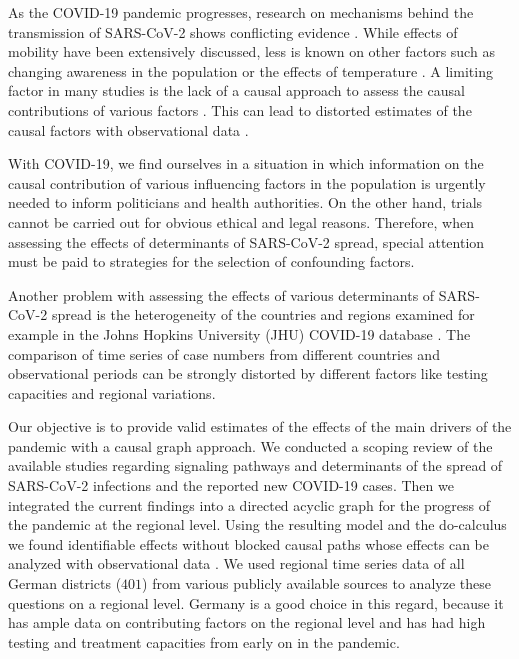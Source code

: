 \documentclass[]{elsarticle} %
\begin{document}
As the COVID-19 pandemic progresses, research on mechanisms behind the transmission of SARS-CoV-2 shows conflicting evidence \citep{who2020report, Chinazzi395, guan2020clinical}. While effects of mobility have been extensively discussed, less is known on other factors such as changing awareness in the population \citep{higgins_correlations_2020, li_retrospective_2020, yuan_trends_2020} or the effects of temperature \citep{bannister-tyrrell_preliminary_2020, demongeot_temperature_2020, liu_impact_2020}. A limiting factor in many studies is the lack of a causal approach to assess the causal contributions of various factors \citep{Greenland1999}. This can lead to distorted estimates of the causal factors with observational data \citep{Greenland1999, schipf_directed_2011, textor_robust_2017}.

With COVID-19, we find ourselves in a situation in which information on the causal contribution of various influencing factors in the population is urgently needed to inform politicians and health authorities. On the other hand, trials cannot be carried out for obvious ethical and legal reasons. Therefore, when assessing the effects of determinants of SARS-CoV-2 spread, special attention must be paid to strategies for the selection of confounding factors.

Another problem with assessing the effects of various determinants of SARS-CoV-2 spread is the heterogeneity of the countries and regions examined for example in the Johns Hopkins University (JHU) COVID-19 database \citep{jhucovid19db2020}. The comparison of time series of case numbers from different countries and observational periods can be strongly distorted by different factors like testing capacities and regional variations.

Our objective is to provide valid estimates of the effects of the main drivers of the pandemic with a causal graph approach. We conducted a scoping review of the available studies regarding signaling pathways and determinants of the spread of SARS-CoV-2 infections and the reported new COVID-19 cases. Then we integrated the current findings into a directed acyclic graph for the progress of the pandemic at the regional level. Using the resulting model and the do-calculus we found identifiable effects without blocked causal paths whose effects can be analyzed with observational data \citep{Pearl_2014}. We used regional time series data of all German districts (\(401\)) from various publicly available sources to analyze these questions on a regional level. Germany is a good choice in this regard, because it has ample data on contributing factors on the regional level and has had high testing and treatment capacities from early on in the pandemic.
\end{document}
